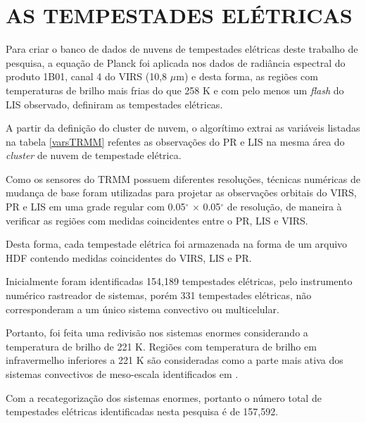 \section{AS TEMPESTADES ELÉTRICAS}
\label{identificaTempestades}



Para criar o banco de dados de nuvens de tempestades elétricas deste trabalho de pesquisa, a equação de Planck foi aplicada nos dados de radiância espectral do produto 1B01, canal 4 do VIRS (10,8 $\mu$m) e desta forma, as regiões com temperaturas de brilho mais frias do que 258 K e com pelo menos um \textit{flash} do LIS observado, definiram as  tempestades elétricas.


A partir da definição do cluster de nuvem, o algorítimo extrai as variáveis listadas na tabela \ref{varsTRMM} refentes as observações do PR e LIS na mesma área do \textit{cluster} de nuvem de tempestade elétrica.

Como os sensores do TRMM possuem diferentes resoluções, técnicas numéricas de mudança de base foram utilizadas para projetar as observações orbitais do VIRS, PR e LIS em uma grade regular com 0.05$^{\circ}$ $\times$ 0.05$^{\circ}$ de resolução, de maneira à verificar as regiões com medidas coincidentes entre o PR, LIS e VIRS.


Desta forma, cada tempestade elétrica foi armazenada na forma de um arquivo HDF contendo medidas coincidentes do VIRS, LIS e PR. 

Inicialmente foram identificadas 154,189 tempestades elétricas, pelo instrumento numérico rastreador de sistemas, porém 331 tempestades elétricas, não corresponderam a um único sistema convectivo ou multicelular. 

Portanto, foi feita uma redivisão nos sistemas enormes considerando a temperatura de brilho de 221 K. Regiões com temperatura de brilho em infravermelho inferiores a 221 K são consideradas como a parte mais ativa dos sistemas convectivos de meso-escala identificados em . 

Com a recategorização dos sistemas enormes, portanto o número total de tempestades elétricas identificadas nesta pesquisa é de 157,592.


